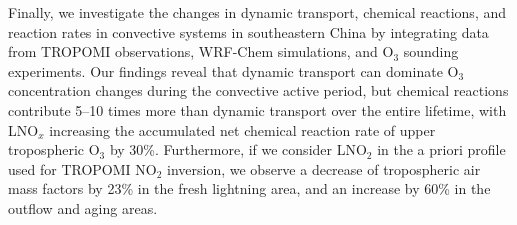 {Finally, we investigate the changes in dynamic transport, chemical reactions, and reaction rates in convective systems in southeastern China by integrating data from TROPOMI observations, WRF-Chem simulations, and O$_3$ sounding experiments.
Our findings reveal that dynamic transport can dominate O$_3$ concentration changes during the convective active period,
but chemical reactions contribute 5--10 times more than dynamic transport over the entire lifetime,
with LNO$_x$ increasing the accumulated net chemical reaction rate of upper tropospheric O$_3$ by 30\%.
Furthermore, if we consider LNO$_2$ in the a priori profile used for TROPOMI NO$_2$ inversion, we observe a decrease of tropospheric air mass factors by 23\% in the fresh lightning area, and an increase by 60\% in the outflow and aging areas.
}
